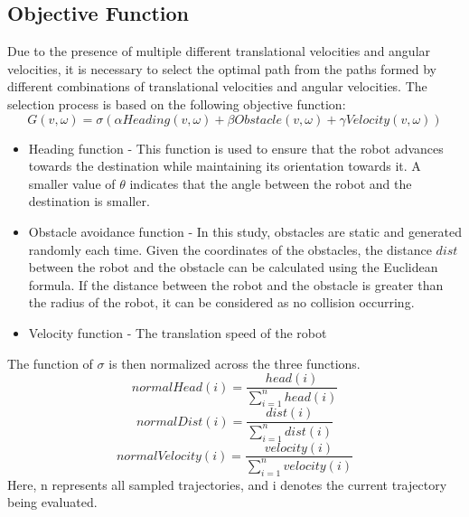 \documentclass[crop=false]{standalone}
\begin{document}
	\subsection{Objective Function}
	Due to the presence of multiple different translational velocities and angular velocities, it is necessary to select the optimal path from the paths formed by different combinations of translational velocities and angular velocities. The selection process is based on the following objective function:
	\begin{equation}
		G(v, \omega)=\sigma(\alpha Heading(v, \omega) + \beta Obstacle(v, \omega) + \gamma Velocity(v, \omega))
	\end{equation}
	\begin{itemize}
		\item Heading function - This function is used to ensure that the robot advances towards the destination while maintaining its orientation towards it. A smaller value of $\theta$ indicates that the angle between the robot and the destination is smaller.
		\item Obstacle avoidance function - In this study, obstacles are static and generated randomly each time. Given the coordinates of the obstacles, the distance $dist$ between the robot and the obstacle can be calculated using the Euclidean formula. If the distance between the robot and the obstacle is greater than the radius of the robot, it can be considered as no collision occurring.
		\item Velocity function - The translation speed of the robot
	\end{itemize}
	
	The function of $\sigma$ is then normalized across the three functions.
	\begin{equation}
		normalHead(i)=\frac{head(i)}{\sum_{i=1}^{n}{head(i)}}
	\end{equation}
	\begin{equation}
		normalDist(i)=\frac{dist(i)}{\sum_{i=1}^{n}{dist(i)}}
	\end{equation}
	\begin{equation}
		normalVelocity(i)=\frac{velocity(i)}{\sum_{i=1}^{n}{velocity(i)}}
	\end{equation}
	Here, n represents all sampled trajectories, and i denotes the current trajectory being evaluated.
\end{document}
